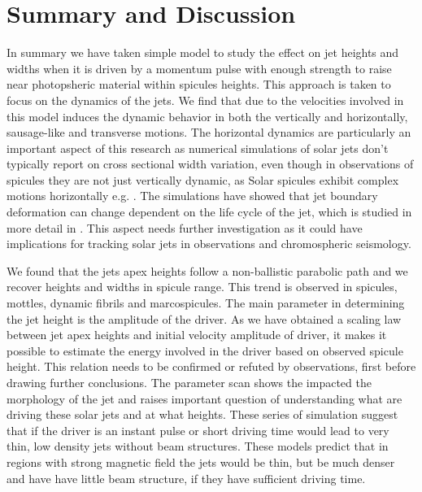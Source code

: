 \documentclass[12pt]{ociamthesis}
\begin{document}
\section{Summary and Discussion}
\label{sec:c2discussion}
In summary we have taken simple model to study the effect on jet heights and widths when it is driven by a momentum pulse with enough strength to raise near photopsheric material within spicules heights. This approach is taken to focus on the dynamics of the jets. We find that due to the velocities involved in this model induces the dynamic behavior in both the vertically and horizontally, sausage-like and transverse motions. The horizontal dynamics are particularly an important aspect of this research as numerical simulations of solar jets don't typically report on cross sectional width variation, even though in observations of spicules they are not just vertically dynamic, as Solar spicules exhibit complex motions horizontally e.g. \citep{Sharma2018ApJ85361S,Antolin2018ApJ85644A}. The simulations have showed that jet boundary deformation can change dependent on the life cycle of the jet, which is studied in more detail in \citep{Mackenzie_Dover_2020}. This aspect needs further investigation as it could have implications for tracking solar jets in observations and chromospheric seismology.    

We found that the jets apex heights follow a non-ballistic parabolic path and we recover heights and widths in spicule range. This trend is observed in spicules, mottles, dynamic fibrils and marcospicules. The main parameter in determining the jet height is the amplitude of the driver. As we have obtained a scaling law between jet apex heights and initial velocity amplitude of driver, it makes it possible to estimate the energy involved in the driver based on observed spicule height. This relation needs to be confirmed or refuted by observations, first before drawing further conclusions. The parameter scan shows the impacted the morphology of the jet and raises important question of understanding what are driving these solar jets and at what heights. These series of simulation suggest that if the driver is an instant pulse or short driving time would lead to very thin, low density jets without beam structures. These models predict that in regions with strong magnetic field the jets would be thin, but be much denser and have have little beam structure, if they have sufficient driving time.
\end{document}
